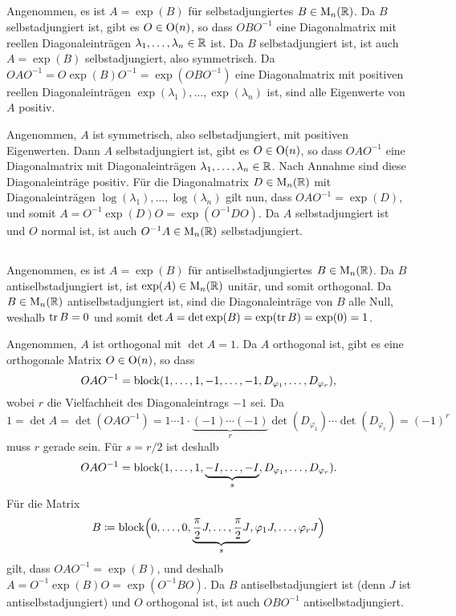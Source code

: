 \documentclass[a4paper, 10pt, numbers=noenddot]{scrartcl}
\begin{document}
\subsection{}

Angenommen, es ist $A = \exp(B)$ für selbstadjungiertes $B \in \operatorname{M}_n(\mathbb{R})$.
Da $B$ selbstadjungiert ist, gibt es $O \in \operatorname{O}(n)$, so dass $O B O^{-1}$ eine Diagonalmatrix mit reellen Diagonaleinträgen $\lambda_1, \dotsc, \lambda_n \in \mathbb{R}$ ist.
Da $B$ selbstadjungiert ist, ist auch $A = \exp(B)$ selbstadjungiert, also symmetrisch.
Da $O A O^{-1} = O \exp(B) O^{-1} = \exp(O B O^{-1})$ eine Diagonalmatrix mit positiven reellen Diagonaleinträgen $\exp(\lambda_1), \dotsc, \exp(\lambda_n)$ ist, sind alle Eigenwerte von $A$ positiv.

Angenommen, $A$ ist symmetrisch, also selbstadjungiert, mit positiven Eigenwerten.
Dann $A$ selbstadjungiert ist, gibt es $O \in \operatorname{O}(n)$, so dass $O A O^{-1}$ eine Diagonalmatrix mit Diagonaleinträgen $\lambda_1, \dotsc, \lambda_n \in \mathbb{R}$.
Nach Annahme sind diese Diagonaleinträge positiv.
Für die Diagonalmatrix $D \in \operatorname{M}_n(\mathbb{R})$ mit Diagonaleinträgen $\log(\lambda_1), \dotsc, \log(\lambda_n)$ gilt nun, dass $O A O^{-1} = \exp(D)$, und somit $A = O^{-1} \exp(D) O = \exp(O^{-1} D O)$.
Da $A$ selbstadjungiert ist und $O$ normal ist, ist auch $O^{-1} A \in \operatorname{M}_n(\mathbb{R})$ selbstadjungiert.





\subsection{}

Angenommen, es ist $A = \exp(B)$ für antiselbstadjungiertes $B \in \operatorname{M}_n(\mathbb{R})$.
Da $B$ antiselbstadjungiert ist, ist $\exp(A) \in \operatorname{M}_n(\mathbb{R})$ unitär, und somit orthogonal.
Da $B \in \operatorname{M}_n(\mathbb{R})$ antiselbstadjungiert ist, sind die Diagonaleinträge von $B$ alle Null, weshalb $\operatorname{tr} B = 0$ und somit $\det A = \det \exp(B) = \exp(\operatorname{tr} B) = \exp(0) = 1$.

Angenommen, $A$ ist orthogonal mit $\det A = 1$.
Da $A$ orthogonal ist, gibt es eine orthogonale Matrix $O \in \operatorname{O}(n)$, so dass
\[
    O A O^{-1}
  = \operatorname{\operatorname{block}}(1, \dotsc, 1, -1, \dotsc, -1, D_{\varphi_1}, \dotsc, D_{\varphi_r}),
\]
wobei $r$ die Vielfachheit des Diagonaleintrags $-1$ sei.
Da
\[
    1
  = \det A
  = \det(O A O^{-1})
  = 1 \dotsm 1 \cdot \underbrace{(-1) \dotsm (-1)}_{r} \det(D_{\varphi_1}) \dotsm \det(D_{\varphi_r})
  = (-1)^r
\]
muss $r$ gerade sein.
Für $s = r/2$ ist deshalb
\[
    O A O^{-1}
  = \operatorname{\operatorname{block}}(1, \dotsc, 1, \underbrace{-I, \dotsc, -I}_{s}, D_{\varphi_1}, \dotsc, D_{\varphi_r}).
\]
Für die Matrix
\[
            B
  \coloneqq \operatorname{\operatorname{block}}\Bigl(0, \dotsc, 0,
                        \underbrace{\frac{\pi}{2} J, \dotsc, \frac{\pi}{2} J}_{s},
                        \varphi_1 J, \dotsc, \varphi_r J
                  \Bigr)
\]
gilt, dass $O A O^{-1} = \exp(B)$, und deshalb $A = O^{-1} \exp(B) O = \exp(O^{-1} B O)$.
Da $B$ antiselbstadjungiert ist (denn $J$ ist antiselbstadjungiert) und $O$ orthogonal ist, ist auch $O B O^{-1}$ antiselbstadjungiert.
\end{document}
